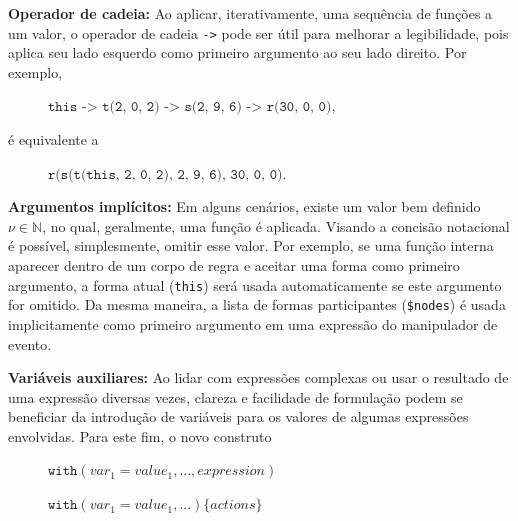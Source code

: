 \textbf{Operador de cadeia:} Ao aplicar, iterativamente, uma sequência de funções a um valor, o operador de cadeia \texttt{->} pode ser útil para melhorar a legibilidade, pois aplica seu lado esquerdo como primeiro argumento ao seu lado direito. Por exemplo,

\vspace{0.5cm}

\begin{description}
    \item[] \qquad \qquad $\texttt{this -> t(2, 0, 2) -> s(2, 9, 6) -> r(30, 0, 0)}$,
\end{description}

\vspace{0.5cm}

\noindent é equivalente a

\vspace{0.5cm}

\begin{description}
    \item[] \qquad \qquad $\texttt{r(s(t(this, 2, 0, 2), 2, 9, 6), 30, 0, 0)}$.
\end{description}

\vspace{0.5cm}

\textbf{Argumentos implícitos:} Em alguns cenários, existe um valor bem definido $\nu \in \mathbb{N}$, no qual, geralmente, uma função é aplicada. Visando a concisão notacional é possível, simplesmente, omitir esse valor. Por exemplo, se uma função interna aparecer dentro de um corpo de regra e aceitar uma forma como primeiro argumento, a forma atual (\texttt{this}) será usada automaticamente se este argumento for omitido. Da mesma maneira, a lista de formas participantes (\texttt{\$nodes}) é usada implicitamente como primeiro argumento em uma expressão do manipulador de evento.

\textbf{Variáveis auxiliares:} Ao lidar com expressões complexas ou usar o resultado de uma expressão diversas vezes, clareza e facilidade de formulação podem se beneficiar da introdução de variáveis para os valores de algumas expressões envolvidas. Para este fim, o novo construto

\vspace{0.5cm}

\begin{description}
    \item[] \qquad \qquad $\texttt{with}(var_1 = value_1, ..., expression)$
    \item[] \qquad \qquad $\texttt{with}(var_1 = value_1, ...) \{actions\}$
\end{description}

